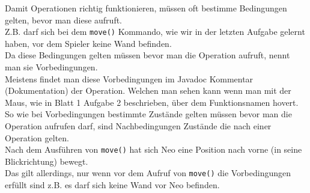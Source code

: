 \begin{Infobox}
    Damit Operationen richtig funktionieren, müssen oft bestimme Bedingungen gelten, bevor man diese aufruft.\\
    Z.B. darf sich bei dem \lstinline{move()} Kommando, wie wir in der letzten Aufgabe gelernt haben, vor dem Spieler keine Wand befinden.\\
    Da diese Bedingungen gelten müssen bevor man die Operation aufruft, nennt man sie Vorbedingungen.\\
    Meistens findet man diese Vorbedingungen im Javadoc Kommentar (Dokumentation) der Operation. Welchen man sehen kann wenn man mit der Maus, wie in Blatt 1 Aufgabe 2 beschrieben, über dem Funktionsnamen hovert.\\

    So wie bei Vorbedingungen bestimmte Zustände gelten müssen bevor man die Operation aufrufen darf, sind Nachbedingungen Zustände die nach einer Operation gelten.\\
    Nach dem Ausführen von \lstinline{move()} hat sich Neo eine Position nach vorne (in seine Blickrichtung) bewegt.\\
    Das gilt allerdings, nur wenn vor dem Aufruf von \lstinline{move()} die Vorbedingungen erfüllt sind z.B. es darf sich keine Wand vor Neo befinden.\\


\end{Infobox}
